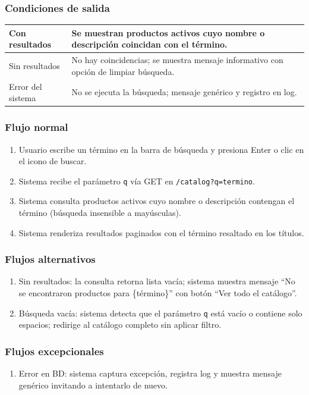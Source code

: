 \documentclass[12pt,a4paper]{article}
\begin{document}
\subsubsection*{Condiciones de salida}
\begin{longtable}{|l|p{10cm}|}
    \hline
    Con resultados    & Se muestran productos activos cuyo nombre o descripción coincidan con el término.    \\ \hline
    Sin resultados    & No hay coincidencias; se muestra mensaje informativo con opción de limpiar búsqueda. \\ \hline
    Error del sistema & No se ejecuta la búsqueda; mensaje genérico y registro en log.                       \\ \hline
\end{longtable}

\subsubsection*{Flujo normal}
\begin{enumerate}[label=FN-\arabic*]
    \item Usuario escribe un término en la barra de búsqueda y presiona Enter o clic en el icono de buscar.
    \item Sistema recibe el parámetro \texttt{q} vía GET en \texttt{/catalog?q=termino}.
    \item Sistema consulta productos activos cuyo nombre o descripción contengan el término (búsqueda insensible a mayúsculas).
    \item Sistema renderiza resultados paginados con el término resaltado en los títulos.
\end{enumerate}

\subsubsection*{Flujos alternativos}
\begin{enumerate}[label=FA-\arabic*]
    \item Sin resultados: la consulta retorna lista vacía; sistema muestra mensaje “No se encontraron productos para \{término\}” con botón “Ver todo el catálogo”.
    \item Búsqueda vacía: sistema detecta que el parámetro \texttt{q} está vacío o contiene solo espacios; redirige al catálogo completo sin aplicar filtro.
\end{enumerate}

\subsubsection*{Flujos excepcionales}
\begin{enumerate}[label=FE-\arabic*]
    \item Error en BD: sistema captura excepción, registra log y muestra mensaje genérico invitando a intentarlo de nuevo.
\end{enumerate}
\end{document}
